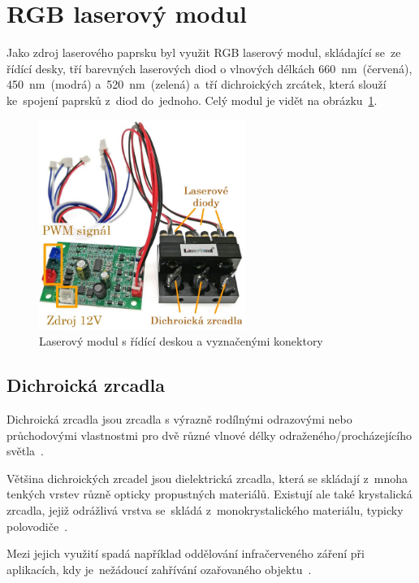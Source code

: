\section{RGB laserový modul}
Jako zdroj laserového paprsku byl využit RGB laserový modul, skládající se~ze řídící desky, tří barevných laserových diod o vlnových délkách 660~nm~(červená), 450~nm~(modrá) a~520~nm~(zelená) a~tří dichroických zrcátek, která slouží ke~spojení paprsků z~diod do~jednoho. Celý modul je vidět na obrázku~\ref{fig:hw_laser-module}.


\begin{figure}[htb]
  \centering
  \includegraphics[width=0.6\textwidth]{img/hw_laser-module.jpg}
  \caption{\label{fig:hw_laser-module} Laserový modul s řídící deskou a vyznačenými konektory}
\end{figure}

\subsection{Dichroická zrcadla}

Dichroická zrcadla jsou zrcadla s výrazně rodílnými odrazovými nebo průchodovými vlastnostmi pro dvě různé vlnové délky odraženého/procházejícího světla~\cite{dichroic-mirrors}.

Většina dichroických zrcadel jsou dielektrická zrcadla, která se skládají z~mnoha tenkých vrstev různě opticky propustných materiálů. Existují ale také krystalická zrcadla, jejiž odrážlivá vrstva se~skládá z~monokrystalického materiálu, typicky polovodiče~\cite{dichroic-mirrors}.

Mezi jejich využití spadá například oddělování infračerveného záření při aplikacích, kdy je~nežádoucí zahřívání ozařovaného objektu~\cite{dichroic-mirrors}.

